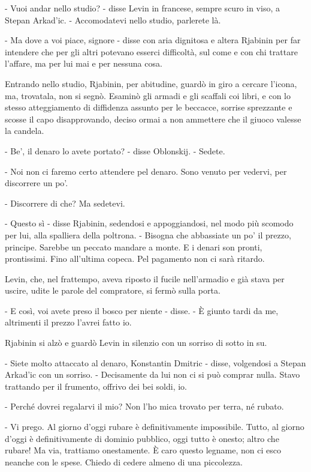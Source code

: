 - Vuoi andar nello studio? - disse Levin in francese, sempre scuro in viso, a Stepan Arkad'ic. - Accomodatevi nello studio, parlerete là. 

- Ma dove a voi piace, signore - disse con aria dignitosa e altera Rjabinin per far intendere che per gli altri potevano esserci difficoltà, sul come e con chi trattare l'affare, ma per lui mai e per nessuna cosa. 

Entrando nello studio, Rjabinin, per abitudine, guardò in giro a cercare l'icona, ma, trovatala, non si segnò. Esaminò gli armadi e gli scaffali coi libri, e con lo stesso atteggiamento di diffidenza assunto per le beccacce, sorrise sprezzante e scosse il capo disapprovando, deciso ormai a non ammettere che il giuoco valesse la candela. 

- Be', il denaro lo avete portato? - disse Oblonskij. - Sedete. 

- Noi non ci faremo certo attendere pel denaro. Sono venuto per vedervi, per discorrere un po'. 

- Discorrere di che? Ma sedetevi. 

- Questo sì - disse Rjabinin, sedendosi e appoggiandosi, nel modo più scomodo per lui, alla spalliera della poltrona. - Bisogna che abbassiate un po' il prezzo, principe. Sarebbe un peccato mandare a monte. E i denari son pronti, prontissimi. Fino all'ultima copeca. Pel pagamento non ci sarà ritardo. 

Levin, che, nel frattempo, aveva riposto il fucile nell'armadio e già stava per uscire, udite le parole del compratore, si fermò sulla porta. 

- E così, voi avete preso il bosco per niente - disse. - È giunto tardi da me, altrimenti il prezzo l'avrei fatto io. 

Rjabinin si alzò e guardò Levin in silenzio con un sorriso di sotto in su. 

- Siete molto attaccato al denaro, Konstantin Dmitric - disse, volgendosi a Stepan Arkad'ic con un sorriso. - Decisamente da lui non ci si può comprar nulla. Stavo trattando per il frumento, offrivo dei bei soldi, io. 

- Perché dovrei regalarvi il mio? Non l'ho mica trovato per terra, né rubato. 

- Vi prego. Al giorno d'oggi rubare è definitivamente impossibile. Tutto, al giorno d'oggi è definitivamente di dominio pubblico, oggi tutto è onesto; altro che rubare! Ma via, trattiamo onestamente. È caro questo legname, non ci esco neanche con le spese. Chiedo di cedere almeno di una piccolezza. 


